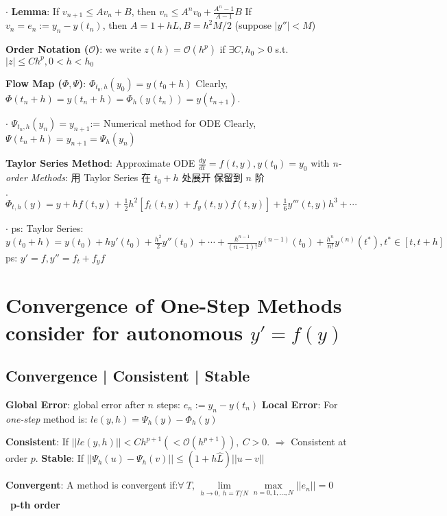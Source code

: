 \documentclass[9pt]{article}
\begin{document}
$\cdot$ \textbf{Lemma}: If $v_{n+1}\leq Av_n+B$, then $v_n\leq A^nv_0+\frac{A^n-1}{A-1}B$ \quad If $v_{n}=e_n:=y_n-y(t_n)$, then $A=1+hL,B=h^2M/2$ {\scriptsize (suppose $|y''|<M$)}

\textbf{Order Notation ($\mathcal{O}$)}: we write $z(h)=\mathcal{O}(h^p)$ if $\exists C,h_0>0$ s.t. $|z|\leq Ch^p,0<h<h_0$

\textbf{Flow Map ($\Phi,\Psi$)}: $\Phi_{t_0,h}(y_0)=y(t_0+h)$ \quad Clearly, $\Phi(t_n+h)=y(t_n+h)=\Phi_h(y(t_n))=y(t_{n+1})$.

$\cdot$ $\Psi_{t_n,h}(y_n)=y_{n+1}$:= Numerical method for ODE \quad Clearly, $\Psi(t_n+h)=y_{n+1}=\Psi_h(y_{n})$

\textbf{Taylor Series Method}: {\small Approximate ODE $\frac{dy}{dt}=f(t,y),y(t_0)=y_0$ with \textit{n-order Methods}: 用 Taylor Series 在 $t_0+h$ 处展开 保留到 $n$ 阶}

$\cdot$ $\Phi_{t,h}(y)=y+hf(t,y)+\frac{1}{2}h^2[f_t(t,y)+f_y(t,y)f(t,y)]+\frac{1}{6}y'''(t,y)h^3+\cdots$

$\cdot$ ps: {\footnotesize Taylor Series: $y(t_0+h)=y(t_0)+hy'(t_0)+\frac{h^2}{2}y''(t_0)+\cdots+\frac{h^{n-1}}{(n-1)!}y^{(n-1)}(t_0)+\frac{h^n}{n!}y^{(n)}(t^*),t^*\in[t,t+h]$ \quad \quad  ps: $y'=f,y''=f_t+f_yf$}


\section{Convergence of One-Step Methods {\scriptsize consider for autonomous $y'=f(y)$}} %

\subsection{Convergence | Consistent | Stable} %
\textbf{Global Error}: global error after $n$ steps: $e_n:=y_n-y(t_n)$ \quad \textbf{Local Error}: {\small For \textit{one-step} method is: $le(y,h)=\Psi_h(y)-\Phi_h(y)$}

\textbf{Consistent}: {\small If $||le(y,h)||<Ch^{p+1} (<\mathcal{O}(h^{p+1})), \ C>0$. $\Rightarrow$ Consistent at order $p$.} \quad \textbf{Stable}: If $||\Psi_h(u)-\Psi_h(v)||\leq(1+h\widehat{L})||u-v||$

\textbf{Convergent}: {\small A method is convergent if:$\forall \ T$, $\lim\limits_{h\to0,\ h=T/N}\max\limits_{n=0,1,...,N}||e_n||=0$} \quad \quad {} \ {\tiny \textbf{p-th order}}
\end{document}
